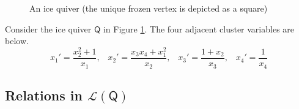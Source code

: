 \documentclass[ALCO,published]{cedram}
\numberwithin{equation}{section}
\renewcommand{\L}{\mathcal{L}}%
\newcommand{\1}{^{-1}}
\def\Q{\mathsf{Q}}
\begin{document}
\begin{figure}[h!t]
\caption{An ice quiver (the unique frozen vertex is depicted as a square)}
\label{fig: mutationexample}
\end{figure}

\begin{ex}
Consider the ice quiver $\Q$ in Figure \ref{fig: mutationexample}.  The four adjacent cluster variables are below.
\[ x_1' = \frac{x_2^2+1}{x_1},\;\;\; x_2'=\frac{x_3x_4+x_1^2}{x_2},\;\;\; x_3'=\frac{1+x_2}{x_3},\;\;\; x_4'=\frac{1}{x_4} \]
\end{ex}

%



\subsection{Relations in $\L(\Q)$}
\end{document}
